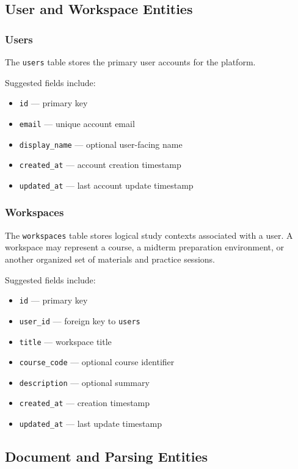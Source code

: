 \documentclass[11pt]{article}
\begin{document}
\subsection{User and Workspace Entities}

\subsubsection{Users}
The \texttt{users} table stores the primary user accounts for the platform.

Suggested fields include:
\begin{itemize}
\item \texttt{id} --- primary key
\item \texttt{email} --- unique account email
\item \texttt{display\_name} --- optional user-facing name
\item \texttt{created\_at} --- account creation timestamp
\item \texttt{updated\_at} --- last account update timestamp
\end{itemize}

\subsubsection{Workspaces}
The \texttt{workspaces} table stores logical study contexts associated with a user. A workspace may represent a course, a midterm preparation environment, or another organized set of materials and practice sessions.

Suggested fields include:
\begin{itemize}
\item \texttt{id} --- primary key
\item \texttt{user\_id} --- foreign key to \texttt{users}
\item \texttt{title} --- workspace title
\item \texttt{course\_code} --- optional course identifier
\item \texttt{description} --- optional summary
\item \texttt{created\_at} --- creation timestamp
\item \texttt{updated\_at} --- last update timestamp
\end{itemize}

\subsection{Document and Parsing Entities}
\end{document}
